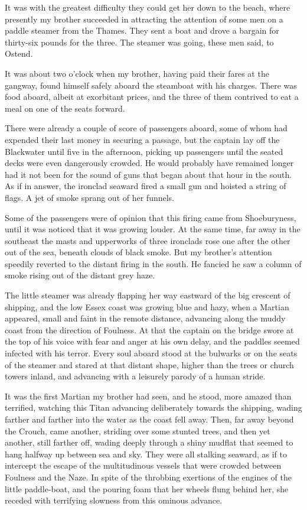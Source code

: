 It was with the greatest difficulty they could get her down to the
beach, where presently my brother succeeded in attracting the
attention of some men on a paddle steamer from the Thames. They
sent a boat and drove a bargain for thirty-six pounds for the
three. The steamer was going, these men said, to Ostend.

It was about two o'clock when my brother, having paid their fares
at the gangway, found himself safely aboard the steamboat with his
charges. There was food aboard, albeit at exorbitant prices, and
the three of them contrived to eat a meal on one of the seats
forward.

There were already a couple of score of passengers aboard, some of
whom had expended their last money in securing a passage, but the
captain lay off the Blackwater until five in the afternoon, picking
up passengers until the seated decks were even dangerously crowded.
He would probably have remained longer had it not been for the
sound of guns that began about that hour in the south. As if in
answer, the ironclad seaward fired a small gun and hoisted a string
of flags. A jet of smoke sprang out of her funnels.

Some of the passengers were of opinion that this firing came from
Shoeburyness, until it was noticed that it was growing louder. At
the same time, far away in the southeast the masts and upperworks
of three ironclads rose one after the other out of the sea, beneath
clouds of black smoke. But my brother's attention speedily reverted
to the distant firing in the south. He fancied he saw a column of
smoke rising out of the distant grey haze.

The little steamer was already flapping her way eastward of the big
crescent of shipping, and the low Essex coast was growing blue and
hazy, when a Martian appeared, small and faint in the remote
distance, advancing along the muddy coast from the direction of
Foulness. At that the captain on the bridge swore at the top of his
voice with fear and anger at his own delay, and the paddles seemed
infected with his terror. Every soul aboard stood at the bulwarks
or on the seats of the steamer and stared at that distant shape,
higher than the trees or church towers inland, and advancing with a
leisurely parody of a human stride.

It was the first Martian my brother had seen, and he stood, more
amazed than terrified, watching this Titan advancing deliberately
towards the shipping, wading farther and farther into the water as
the coast fell away. Then, far away beyond the Crouch, came
another, striding over some stunted trees, and then yet another,
still farther off, wading deeply through a shiny mudflat that
seemed to hang halfway up between sea and sky. They were all
stalking seaward, as if to intercept the escape of the
multitudinous vessels that were crowded between Foulness and the
Naze. In spite of the throbbing exertions of the engines of the
little paddle-boat, and the pouring foam that her wheels flung
behind her, she receded with terrifying slowness from this ominous
advance.

